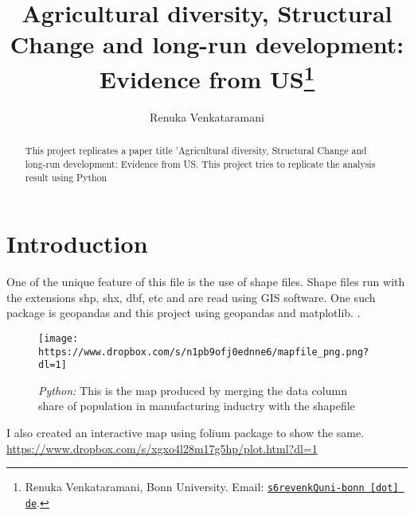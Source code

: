 \documentclass[11pt, a4paper, leqno]{article}
\begin{document}
\title{Agricultural diversity, Structural Change and long-run development: Evidence from US\thanks{Renuka Venkataramani, Bonn University. Email: \href{mailto:s6revenkQuni-bonn.de}{\nolinkurl{s6revenkQuni-bonn [dot] de}}.}}

\author{Renuka Venkataramani}


\maketitle


\begin{abstract}
    This project replicates a paper title 'Agricultural diversity, Structural Change and long-run development: Evidence from US.
    This project tries to replicate the analysis result using Python
    \citet{fiszbein2022agricultural}
\end{abstract}

\clearpage


\section{Introduction} %
\label{sec:introduction}

One of the unique feature of this file is the use of shape files. Shape files run with the extensions shp, shx, dbf, etc and are read using GIS software.
One such package is geopandas and this project using geopandas and matplotlib.
\citet{GaudeckerEconProjectTemplates}.




\begin{figure}[H]

    \centering
    \texttt{[image: https://www.dropbox.com/s/n1pb9ofj0ednne6/mapfile\_png.png?dl=1]}

    \caption{\emph{Python:} This is the map produced by merging the data column share of population in manufacturing
    inductry with the shapefile}
    \label{fig:Mapfile: Share of population in the manufacturing industry}

\end{figure}

I also created an interactive map using folium package to show the same. 
\url{https://www.dropbox.com/s/xgxo4l28m17g5hp/plot.html?dl=1}
\end{document}
